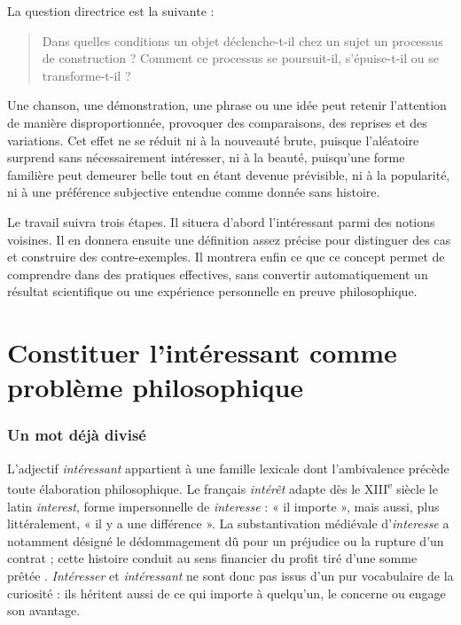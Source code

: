 \documentclass[11pt,a4paper]{article}
\begin{document}
La question directrice est la suivante :

\begin{quote}
Dans quelles conditions un objet déclenche-t-il chez un sujet un processus de
construction ? Comment ce processus se poursuit-il, s'épuise-t-il ou se
transforme-t-il ?
\end{quote}

Une chanson, une démonstration, une phrase ou une idée peut retenir l'attention
de manière disproportionnée, provoquer des comparaisons, des reprises et des
variations. Cet effet ne se réduit ni à la nouveauté brute, puisque l'aléatoire
surprend sans nécessairement intéresser, ni à la beauté, puisqu'une forme
familière peut demeurer belle tout en étant devenue prévisible, ni à la
popularité, ni à une préférence subjective entendue comme donnée sans histoire.

Le travail suivra trois étapes. Il situera d'abord l'intéressant parmi des
notions voisines. Il en donnera ensuite une définition assez précise pour
distinguer des cas et construire des contre-exemples. Il montrera enfin ce que
ce concept permet de comprendre
dans des pratiques effectives, sans convertir automatiquement un résultat
scientifique ou une expérience personnelle en preuve philosophique.

\part{Constituer l'intéressant comme problème philosophique}

\section{Un mot déjà divisé}

L'adjectif \emph{intéressant} appartient à une famille lexicale dont
l'ambivalence précède toute élaboration philosophique. Le français
\emph{intérêt} adapte dès le XIII\textsuperscript{e} siècle le latin
\emph{interest}, forme impersonnelle de \emph{interesse} : « il importe », mais
aussi, plus littéralement, « il y a une différence ». La substantivation
médiévale d'\emph{interesse} a notamment désigné le dédommagement dû pour un
préjudice ou la rupture d'un contrat ; cette histoire conduit au sens financier
du profit tiré d'une somme prêtée
\parencite{academie2026interet,cnrtl2026interet}. \emph{Intéresser} et
\emph{intéressant} ne sont donc pas issus d'un pur vocabulaire de la curiosité :
ils héritent aussi de ce qui importe à quelqu'un, le concerne ou engage son
avantage.
\end{document}
